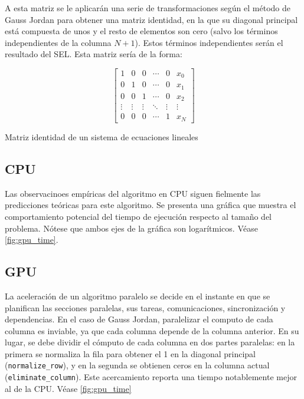 A esta matriz se le aplicarán una serie de transformaciones según el método
de Gauss Jordan para obtener una matriz identidad,
en la que su diagonal principal está compuesta de unos y el resto de elementos
son cero (salvo los términos independientes de la columna $N+1$).
Estos términos independientes serán el resultado del SEL.
Esta matriz sería de la forma:

\begin{mycapequ}[h]
\begin{equation}
    \begin{bmatrix}
        1 & 0 & 0 & \cdots & 0 & x_0 \\
        0 & 1 & 0 & \cdots & 0 & x_1 \\
        0 & 0 & 1 & \cdots & 0 & x_2 \\
        \vdots & \vdots & \vdots & \ddots & \vdots & \vdots \\
        0 & 0 & 0 & \cdots & 1 & x_N
    \end{bmatrix}
\end{equation}
\caption{Matriz identidad de un sistema de ecuaciones lineales}
\label{eq:sel_identity}
\end{mycapequ}

\subsection{CPU}

Las observacinoes empíricas del algoritmo en CPU siguen fielmente
las predicciones teóricas para este algoritmo.
Se presenta una gráfica que muestra el comportamiento potencial
del tiempo de ejecución respecto al tamaño del problema.
Nótese que ambos ejes de la gráfica son logarítmicos.
Véase \ref{fig:gpu_time}.

\subsection{GPU}

La aceleración de un algoritmo paralelo se decide
en el instante en que se planifican las secciones paralelas,
sus tareas, comunicaciones, sincronización y dependencias.
En el caso de Gauss Jordan, paralelizar el computo
de cada columna es inviable, ya que cada columna
depende de la columna anterior.
En su lugar, se debe dividir el cómputo de cada columna
en dos partes paralelas: en la primera se normaliza la fila
para obtener el 1 en la diagonal principal
(\texttt{normalize\_row}),
y en la segunda se obtienen ceros en la columna actual
(\texttt{eliminate\_column}).
Este acercamiento reporta una tiempo notablemente mejor
al de la CPU. Véase \ref{fig:gpu_time}

